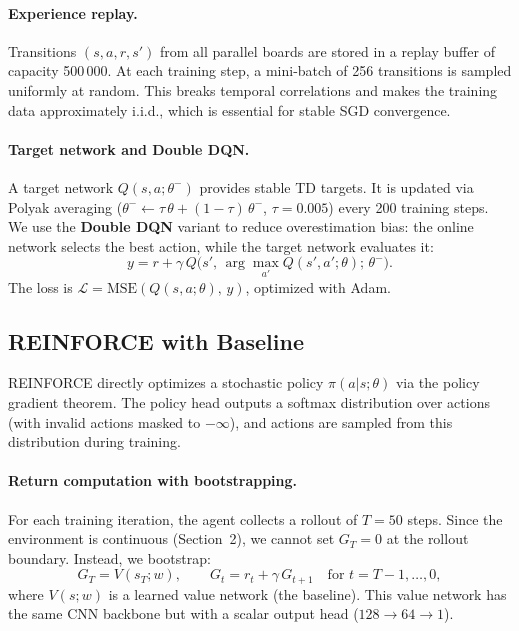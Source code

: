 \documentclass[11pt, a4paper]{article}
\begin{document}
\paragraph{Experience replay.}
Transitions $(s, a, r, s')$ from all parallel boards are stored in a replay buffer of capacity
500\,000. At each training step, a mini-batch of 256 transitions is sampled uniformly at random.
This breaks temporal correlations and makes the training data approximately i.i.d., which is
essential for stable SGD convergence.

\paragraph{Target network and Double DQN.}
A target network $Q(s, a; \theta^-)$ provides stable TD targets. It is updated via Polyak
averaging ($\theta^- \leftarrow \tau\,\theta + (1{-}\tau)\,\theta^-$, $\tau{=}0.005$) every
200 training steps. We use the \textbf{Double DQN} variant to reduce overestimation bias:
the online network selects the best action, while the target network evaluates it:
\begin{equation}
y = r + \gamma \, Q\!\bigl(s',\, \arg\max_{a'} Q(s', a'; \theta);\, \theta^-\bigr).
\end{equation}
The loss is $\mathcal{L} = \text{MSE}(Q(s, a; \theta),\, y)$, optimized with Adam.

\subsection{REINFORCE with Baseline}
\label{sec:reinforce}

REINFORCE directly optimizes a stochastic policy $\pi(a|s; \theta)$ via the policy gradient
theorem. The policy head outputs a softmax distribution over actions (with invalid actions
masked to $-\infty$), and actions are sampled from this distribution during training.

\paragraph{Return computation with bootstrapping.}
For each training iteration, the agent collects a rollout of $T{=}50$ steps. Since the
environment is continuous (Section~2), we cannot set $G_T = 0$ at the rollout boundary.
Instead, we bootstrap:
\begin{equation}
G_T = V(s_T; w), \qquad G_t = r_t + \gamma \, G_{t+1} \quad \text{for } t = T{-}1, \ldots, 0,
\end{equation}
where $V(s; w)$ is a learned value network (the baseline). This value network has the same CNN
backbone but with a scalar output head ($128 {\to} 64 {\to} 1$).
\end{document}
